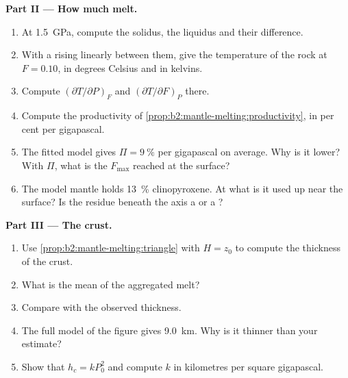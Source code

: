 \begin{problem}
\noindent\textbf{Part II --- How much melt.}
\begin{enumerate}[resume]
\item At \qty{1.5}{GPa}, compute the solidus, the  liquidus and their
difference.
\item With a  rising linearly between them, give the temperature of
the rock at $F = 0.10$, in degrees Celsius and in kelvins.
\item Compute $(\partial T/\partial P)_F$ and $(\partial T/\partial F)_P$ there.
\item Compute the productivity of \cref{prop:b2:mantle-melting:productivity}, in
per cent per gigapascal.
\item The fitted model gives $\Pi = \qty{9}{\percent}$ per gigapascal on average.
Why is it lower? With $\Pi$, what is the  $F_{\max}$ reached at the
surface?
\item The model mantle holds \qty{13}{\percent} clinopyroxene. At what  is it used up near the surface? Is the residue beneath the axis a
 or a ?
\end{enumerate}

\noindent\textbf{Part III --- The crust.}
\begin{enumerate}[resume]
\item Use \cref{prop:b2:mantle-melting:triangle} with $H = z_0$ to compute the
thickness of the crust.
\item What is the mean  of the aggregated melt?
\item Compare with the observed thickness.
\item The full model of the figure gives \qty{9.0}{km}. Why is it thinner than
your estimate?
\item Show that $h_c = k P_0^2$ and compute $k$ in kilometres per square
gigapascal.
\end{enumerate}


\end{problem}
